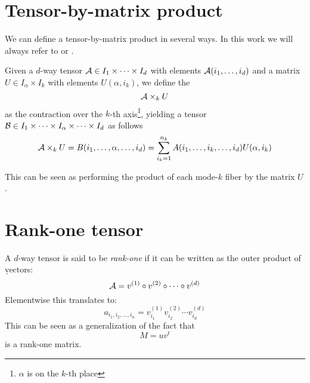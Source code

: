 \section{Tensor-by-matrix product}
We can define a tensor-by-matrix product in several ways. In this work we will always refer to  or .

\begin{Def} \label{def:tensor-matrix-product}
  Given a $d$-way tensor $\mathcal{A} \in I_1 \times \cdots \times I_d$ with elements $\mathcal{A}(i_1,\ldots,i_d)$ and a matrix $U \in I_\alpha \times I_k$ with elements $U(\alpha,i_k)$, we define the 
  \begin{equation*}
    \mathcal{A} \times_k U
  \end{equation*}
  as the contraction over the $k$-th axis\footnote{$\alpha$ is on the $k$-th place}, yielding a tensor $\mathcal{B} \in I_1 \times \cdots \times I_\alpha \times \cdots \times I_d$ as follows
  \begin{equation*}
    \mathcal{A} \times_k U = B(i_1,\ldots,\alpha,\ldots,i_d) = \sum_{i_k = 1}^{n_k} A(i_1,\ldots,i_k,\ldots,i_d) U(\alpha,i_k)
  \end{equation*}
\end{Def}
This can be seen as performing the product of each mode-$k$ fiber by the matrix $U$.

\section{Rank-one tensor}
A $d$-way tensor \A is said to be \emph{rank-one} if it can be written as the outer product of \d vectors:
\begin{equation}
  \mathcal{A} = v^{(1)} \circ v^{(2)} \circ \cdots \circ v^{(d)}
\end{equation}
Elementwise this translates to:
\begin{equation}
  a_{i_1,i_2,\ldots,i_n} = v_{i_1}^{(1)} v_{i_2}^{(2)} \cdots v_{i_d}^{(d)}
\end{equation}
This can be seen as a generalization of the fact that
\begin{equation*}
  M = u v^t
\end{equation*}
is a rank-one matrix.


